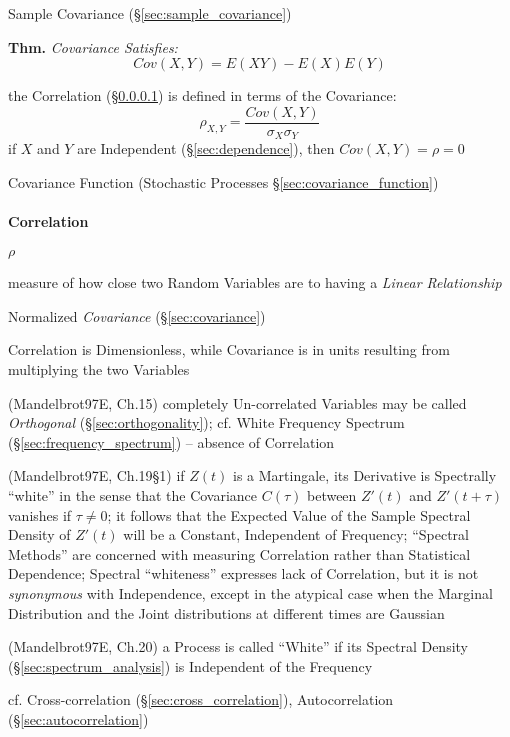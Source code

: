 \fist Sample Covariance (\S\ref{sec:sample_covariance})

\textbf{Thm.} \emph{Covariance Satisfies:
  \[
    Cov(X,Y) = E(XY) - E(X)E(Y)
  \]
}

the Correlation (\S\ref{sec:statistical_correlation}) is defined in terms of the
Covariance:
\[
  \rho_{X,Y} = \frac{Cov(X,Y)}{\sigma_X \sigma_Y}
\]
if $X$ and $Y$ are Independent (\S\ref{sec:dependence}), then
$Cov(X,Y) = \rho = 0$

\fist Covariance Function (Stochastic Processes \S\ref{sec:covariance_function})



\paragraph{Correlation}\label{sec:statistical_correlation}\hfill

$\rho$

measure of how close two Random Variables are to having a \emph{Linear
  Relationship}

Normalized \emph{Covariance} (\S\ref{sec:covariance})

Correlation is Dimensionless, while Covariance is in units resulting from
multiplying the two Variables

(Mandelbrot97E, Ch.15) completely Un-correlated Variables may be called
\emph{Orthogonal} (\S\ref{sec:orthogonality}); cf. White Frequency Spectrum
(\S\ref{sec:frequency_spectrum}) -- absence of Correlation

(Mandelbrot97E, Ch.19\S 1) if $Z(t)$ is a Martingale, its Derivative is
Spectrally ``white'' in the sense that the Covariance $C(\tau)$ between $Z'(t)$
and $Z'(t + \tau)$ vanishes if $\tau \neq 0$; it follows that the Expected Value
of the Sample Spectral Density of $Z'(t)$ will be a Constant, Independent of
Frequency; ``Spectral Methods'' are concerned with measuring Correlation rather
than Statistical Dependence; Spectral ``whiteness'' expresses lack of
Correlation, but it is not \emph{synonymous} with Independence, except in the
atypical case when the Marginal Distribution and the Joint distributions at
different times are Gaussian

(Mandelbrot97E, Ch.20) a Process is called ``White'' if its Spectral Density
(\S\ref{sec:spectrum_analysis}) is Independent of the Frequency

\fist cf. Cross-correlation (\S\ref{sec:cross_correlation}), Autocorrelation
(\S\ref{sec:autocorrelation})

